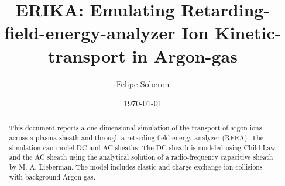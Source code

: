 \documentclass[%
 aapm,
 mph,%
 amsmath,amssymb,
 reprint,%
]{revtex4-2}
\begin{document}

\title[Ion transport in a retarding field energy analyzer]{ERIKA: Emulating Retarding-field-energy-analyzer Ion Kinetic-transport in Argon-gas}

\author{Felipe Soberon}

\date{\today}

\begin{abstract}
This document reports a one-dimensional simulation of the transport of argon ions across a plasma sheath and through a
retarding field energy analyzer (RFEA). The simulation can model DC and AC sheaths. The DC sheath is modeled using Child Law
and the AC sheath using the analytical solution of a radio-frequency capacitive sheath by M. A. Lieberman. The model includes
elastic and charge exchange ion collisions with background Argon gas. 
\end{abstract}

\maketitle

 



\nocite{*}

\end{document}
